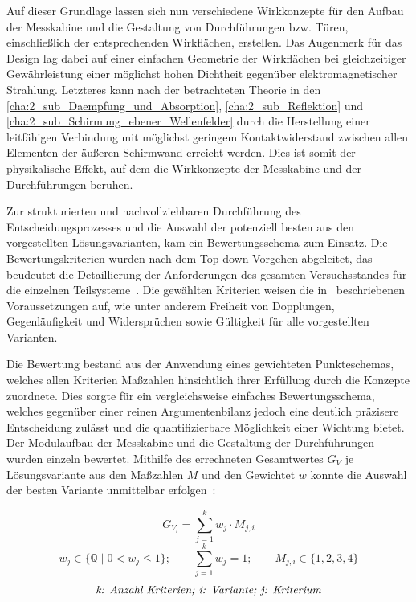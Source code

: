 Auf dieser Grundlage lassen sich nun verschiedene Wirkkonzepte für den Aufbau der Messkabine und die Gestaltung von Durchführungen bzw. Türen, einschließlich der entsprechenden Wirkflächen, erstellen. Das Augenmerk für das Design lag dabei auf einer einfachen Geometrie der Wirkflächen bei gleichzeitiger Gewährleistung einer möglichst hohen Dichtheit gegenüber elektromagnetischer Strahlung. Letzteres kann nach der betrachteten Theorie in den \Abschnitten\ref{cha:2_sub_Daempfung_und_Absorption}, \ref{cha:2_sub_Reflektion} und \ref{cha:2_sub_Schirmung_ebener_Wellenfelder} durch die Herstellung einer leitfähigen Verbindung mit möglichst geringem Kontaktwiderstand zwischen allen Elementen der äußeren Schirmwand erreicht werden. Dies ist somit der physikalische Effekt, auf dem die Wirkkonzepte der Messkabine und der Durchführungen beruhen. 
\par
\vspace{\linespace}
Zur strukturierten und nachvollziehbaren Durchführung des Entscheidungsprozesses und die Auswahl der potenziell besten aus den vorgestellten Lösungsvarianten, kam ein Bewertungsschema zum Einsatz. Die Bewertungskriterien wurden nach dem Top-down-Vorgehen abgeleitet, das beudeutet die Detaillierung der Anforderungen des gesamten Versuchsstandes für die einzelnen Teilsysteme~\cite{Pahl_Beitz_Konstruktionslehre}. Die gewählten Kriterien weisen die in~\cite{Pahl_Beitz_Konstruktionslehre} beschriebenen Voraussetzungen auf, wie unter anderem Freiheit von Dopplungen, Gegenläufigkeit und Widersprüchen sowie Gültigkeit für alle vorgestellten Varianten.
\par
\vspace{\linespace}
Die Bewertung bestand aus der Anwendung eines gewichteten Punkteschemas, welches allen Kriterien Maßzahlen hinsichtlich ihrer Erfüllung durch die Konzepte zuordnete. Dies sorgte für ein vergleichsweise einfaches Bewertungsschema, welches gegenüber einer reinen Argumentenbilanz jedoch eine deutlich präzisere Entscheidung zulässt und die quantifizierbare Möglichkeit einer Wichtung bietet. Der Modulaufbau der Messkabine und die Gestaltung der Durchführungen wurden einzeln bewertet. Mithilfe des errechneten Gesamtwertes $G_V$ je Lösungsvariante aus den Maßzahlen $M$ und den Gewichtet $w$ konnte die Auswahl der besten Variante unmittelbar erfolgen~\cite{Pahl_Beitz_Konstruktionslehre}:

\begin{equation}
    G_{V_i} = \sum_{j=1}^{k} w_j \cdot M_{j,i}
    \label{eq:3_Gesamtwert_Variantenvergleich}
\end{equation}
\begin{equation}
    w_j \in \{\mathbb{Q} \;\vert\; 0 < w_j \leq 1\}; \qquad \sum_{j=1}^{k} w_j = 1; \qquad M_{j,i} \in \{1,2,3,4\}
    \label{eq:3_Wichtung_Bewertung}
\end{equation}
\begin{equation*}
    \text{\textit{k: Anzahl Kriterien; i: Variante; j: Kriterium}}
\end{equation*}

